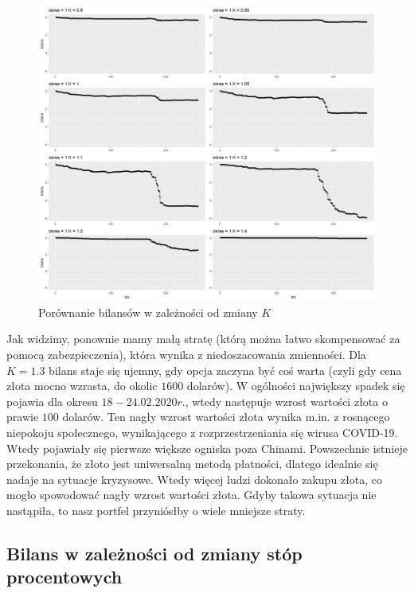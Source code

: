 \documentclass[12pt]{article}
\begin{document}
\begin{figure}[ht!]
\centering
\includegraphics[width=\linewidth]{bilans_prawdziwa_trajektoria_gold_zmiana_K_ciekawe_rowna_skala.png}
\caption{Porównanie bilansów w zależności od zmiany $K$}
\end{figure}

Jak widzimy, ponownie mamy małą stratę (którą można łatwo skompensować za pomocą zabezpieczenia), która wynika z niedoszacowania zmienności. Dla $K=1.3$ bilans staje się ujemny, gdy opcja zaczyna być coś warta (czyli gdy cena złota mocno wzrasta, do okolic $1600$ dolarów). W ogólności największy spadek się pojawia dla okresu $18-24.02.2020r.$, wtedy następuje wzrost wartości złota o prawie $100$ dolarów. Ten nagły wzrost wartości złota wynika m.in. z rosnącego niepokoju społecznego, wynikającego z rozprzestrzeniania się wirusa COVID-19. Wtedy pojawiały się pierwsze większe ogniska poza Chinami. Powszechnie istnieje przekonania, że złoto jest uniwersalną metodą płatności, dlatego idealnie się nadaje na sytuacje kryzysowe. Wtedy więcej ludzi dokonało zakupu złota, co mogło spowodować nagły wzrost wartości złota. Gdyby takowa sytuacja nie nastąpiła, to nasz portfel przyniósłby o wiele mniejsze straty. 
\newpage
\subsection{Bilans w zależności od zmiany stóp procentowych}
\end{document}
